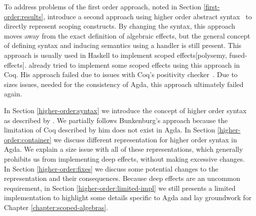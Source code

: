 
To address problems of the first order approach, noted in Section
\ref{first-order:results}, \citeauthor{DBLP:conf/haskell/WuSH14} introduce a
second approach using higher order abstract
syntax~\cite{DBLP:conf/haskell/WuSH14} to directly represent scoping
constructs.
By changing the syntax, this approach moves away from the exact definition of
algebraic effects, but the general concept of defining syntax and inducing
semantics using a handler is still present.
This approach is usually used in Haskell to implement scoped effects[polysemy,
fused-effects].
\citeauthor{bunkenburg2019modeling} already tried to implement some scoped
effects using this approach in Coq.
His approach failed due to issues with Coq's positivity
checker~\cite{bunkenburg2019modeling}.
Due to sizes issues, needed for the consistency of Agda, this approach
ultimately failed again.

In Section \ref{higher-order:syntax} we introduce the concept of higher order
syntax as described by \textcite{DBLP:conf/haskell/WuSH14}.
We partially follows Bunkenburg's approach because the limitation of Coq
described by him does not exist in Agda.
In Section \ref{higher-order:container} we discuss different
representation for higher order syntax in Agda.
We explain a size issue with all of these representations, which generally
prohibits us from implementing deep effects, without making excessive changes.
In Section \ref{higher-order:fixes} we discuss some potential changes to the
representation and their consequences.
Because deep effects are an uncommon requirement, in Section
\ref{higher-order:limited-impl} we still presents a limited implementation
to highlight some details specific to Agda and lay groundwork for Chapter
\ref{chapter:scoped-algebras}.


